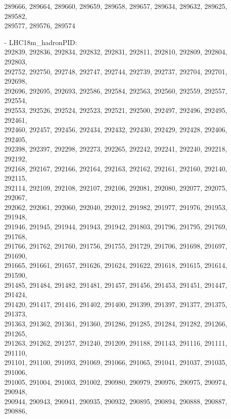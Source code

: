 \begin{appendix}
\begin{itemize}
     289666, 289664, 289660, 289659, 289658, 289657, 289634, 289632, 289625, 289582,\\
     289577, 289576, 289574
    \item[-] LHC18m\_hadronPID:\\[1pt]
     292839, 292836, 292834, 292832, 292831, 292811, 292810, 292809, 292804, 292803,\\
     292752, 292750, 292748, 292747, 292744, 292739, 292737, 292704, 292701, 292698,\\
     292696, 292695, 292693, 292586, 292584, 292563, 292560, 292559, 292557, 292554,\\
     292553, 292526, 292524, 292523, 292521, 292500, 292497, 292496, 292495, 292461,\\
     292460, 292457, 292456, 292434, 292432, 292430, 292429, 292428, 292406, 292405,\\
     292398, 292397, 292298, 292273, 292265, 292242, 292241, 292240, 292218, 292192,\\
     292168, 292167, 292166, 292164, 292163, 292162, 292161, 292160, 292140, 292115,\\
     292114, 292109, 292108, 292107, 292106, 292081, 292080, 292077, 292075, 292067,\\
     292062, 292061, 292060, 292040, 292012, 291982, 291977, 291976, 291953, 291948,\\
     291946, 291945, 291944, 291943, 291942, 291803, 291796, 291795, 291769, 291768,\\
     291766, 291762, 291760, 291756, 291755, 291729, 291706, 291698, 291697, 291690,\\
     291665, 291661, 291657, 291626, 291624, 291622, 291618, 291615, 291614, 291590,\\
     291485, 291484, 291482, 291481, 291457, 291456, 291453, 291451, 291447, 291424,\\
     291420, 291417, 291416, 291402, 291400, 291399, 291397, 291377, 291375, 291373,\\
     291363, 291362, 291361, 291360, 291286, 291285, 291284, 291282, 291266, 291265,\\
     291263, 291262, 291257, 291240, 291209, 291188, 291143, 291116, 291111, 291110,\\
     291101, 291100, 291093, 291069, 291066, 291065, 291041, 291037, 291035, 291006,\\
     291005, 291004, 291003, 291002, 290980, 290979, 290976, 290975, 290974, 290948,\\
     290944, 290943, 290941, 290935, 290932, 290895, 290894, 290888, 290887, 290886,\\

\end{itemize}
\end{appendix}
